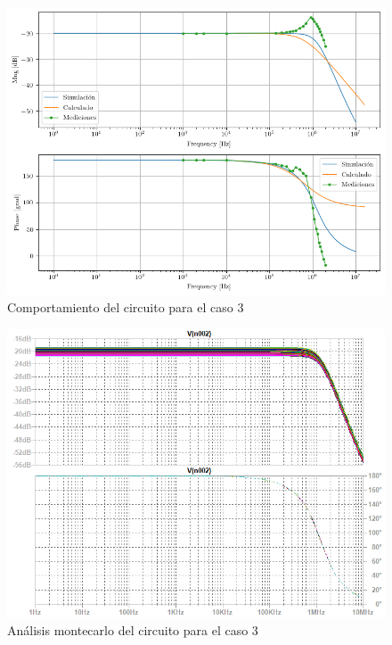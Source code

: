 \begin{figure}[H]
\begin{centering}
\includegraphics[scale=0.5]{../Ex1/iA/Resources1a/H3}
\par\end{centering}
\caption{Comportamiento del circuito para el caso 3}
\label{1_a_2_c}

\end{figure}

\begin{figure}[H]
\begin{centering}
\includegraphics[scale=0.5]{../Ex1/iA/Resources1a/montecarlo1a_3}
\par\end{centering}
\caption{Análisis montecarlo del circuito para el caso 3}

\end{figure}


